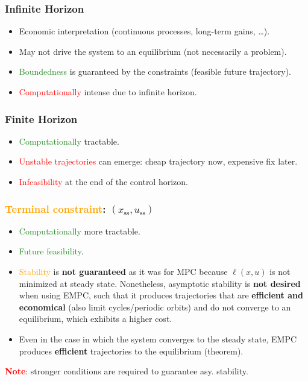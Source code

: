 \subsubsection*{Infinite Horizon}
\begin{itemize}
    \item Economic interpretation (continuous processes, long-term gains, \ldots).
    \item May not drive the system to an equilibrium (not necessarily a problem).
    \item \textcolor{ForestGreen}{Boundedness} is guaranteed by the constraints (feasible future trajectory).
    \item \textcolor{red}{Computationally} intense due to infinite horizon. 
\end{itemize}
\subsubsection*{Finite Horizon}
\begin{itemize}
    \item \textcolor{ForestGreen}{Computationally} tractable.
    \item \textcolor{red}{Unstable trajectories} can emerge: cheap trajectory now, expensive fix later.
    \item \textcolor{red}{Infeasibility} at the end of the control horizon. 
\end{itemize}
\subsubsection*{\textcolor{orange}{Terminal constraint}\textcolor{black}{: $(x_\mathrm{ss}, u_\mathrm{ss})$}}
\begin{itemize}
    \item \textcolor{ForestGreen}{Computationally} more tractable.
    \item \textcolor{ForestGreen}{Future feasibility}.
    \item \textcolor{orange}{Stability} is \textbf{not guaranteed} as it was for MPC because $\ell(x,u)$ is not minimized at steady state. Nonetheless, asymptotic stability is \textbf{not desired} when using EMPC, such that it produces trajectories that are \textbf{efficient and economical}  (also limit cycles/periodic orbits) and do not converge to an equilibrium, which exhibits a higher cost.
    \item Even in the case in which the system converges to the steady state, EMPC produces \textbf{efficient}  trajectories to the equilibrium (theorem).
\end{itemize}
\textcolor{red}{\textbf{Note}}: stronger conditions are required to guarantee asy. stability.